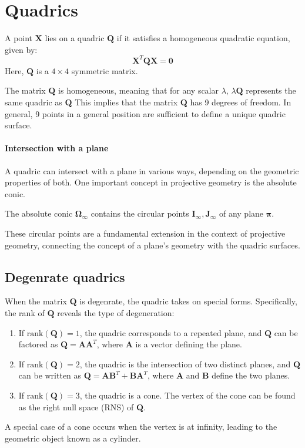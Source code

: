 \section{Quadrics}

\begin{definition}
    A point $\mathbf{X}$ lies on a quadric $\mathbf{Q}$ if it satisfies a homogeneous quadratic equation, given by:
    \[\mathbf{X}^T\mathbf{Q} \mathbf{X} = \mathbf{0}\]
    Here, $\mathbf{Q}$ is a $4\times 4$ symmetric matrix.
\end{definition}

The matrix $\mathbf{Q}$ is homogeneous, meaning that for any scalar $\lambda$, $\lambda\mathbf{Q}$ represents the same quadric as $\mathbf{Q}$
This implies that the matrix $\mathbf{Q}$ has 9 degrees of freedom. 
In general, 9 points in a general position are sufficient to define a unique quadric surface.

\paragraph*{Intersection with a plane}
A quadric can intersect with a plane in various ways, depending on the geometric properties of both. One important concept in projective geometry is the absolute conic.
\begin{proposition}
    The absolute conic $\mathbf{\Omega}_{\infty}$ contains the circular points $\mathbf{I}_{\infty},\mathbf{J}_{\infty}$ of any plane $\boldsymbol{\pi}$. 
\end{proposition}
These circular points are a fundamental extension in the context of projective geometry, connecting the concept of a plane's geometry with the quadric surfaces.

\subsection{Degenrate quadrics}
When the matrix $\mathbf{Q}$ is degenrate, the quadric takes on special forms. Specifically, the rank of $\mathbf{Q}$ reveals the type of degeneration:
\begin{enumerate}
    \item If $\text{rank}(\mathbf{Q})=1$, the quadric corresponds to a repeated plane, and $\mathbf{Q}$ can be factored as $\mathbf{Q}=\mathbf{AA}^T$, where $\mathbf{A}$ is a vector defining the plane.
    \item If $\text{rank}(\mathbf{Q})=2$, the quadric is the intersection of two distinct planes, and $\mathbf{Q}$ can be written as $\mathbf{Q}=\mathbf{AB}^T+\mathbf{BA}^T$, where $\mathbf{A}$ and $\mathbf{B}$ define the two planes.
    \item If $\text{rank}(\mathbf{Q})=3$, the quadric is a cone. The vertex of the cone can be found as the right null space (RNS) of $\mathbf{Q}$. 
\end{enumerate}
A special case of a cone occurs when the vertex is at infinity, leading to the geometric object known as a cylinder.